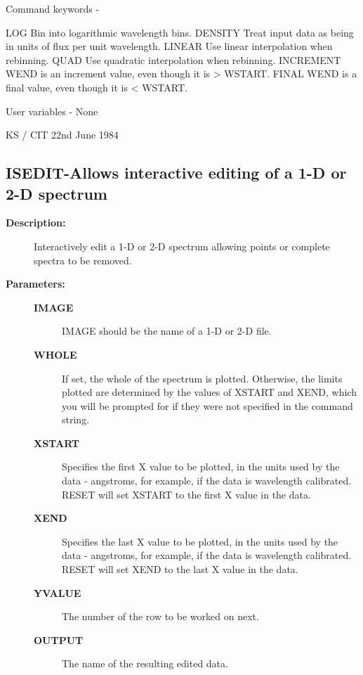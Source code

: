 \begin{description}
\begin{description}
\begin{terminalv}
 Command keywords -

 LOG        Bin into logarithmic wavelength bins.
 DENSITY    Treat input data as being in units of flux per unit
            wavelength.
 LINEAR     Use linear interpolation when rebinning.
 QUAD       Use quadratic interpolation when rebinning.
 INCREMENT  WEND is an increment value, even though it is > WSTART.
 FINAL      WEND is a final value, even though it is < WSTART.

 User variables - None

                                     KS / CIT 22nd June 1984
\end{terminalv}
\end{description}
\subsection{ISEDIT-\label{ISEDIT}Allows interactive editing of a 1-D or 2-D spectrum}
\begin{description}

\item [\textbf{Description:}]
 Interactively edit a 1-D or 2-D spectrum allowing points or
 complete spectra to be removed.

\item [\textbf{Parameters:}]
\begin{description}
\item [\textbf{IMAGE}]
 IMAGE should be the name of a 1-D or 2-D file.
\item [\textbf{WHOLE}]
 If set, the whole of the spectrum is plotted.
 Otherwise, the limits plotted are determined by the
 values of XSTART and XEND, which you will be prompted
 for if they were not specified in the command string.
\item [\textbf{XSTART}]
 Specifies the first X value to be plotted, in the units used
 by the data - angstroms, for example, if the data is wavelength
 calibrated.  RESET will set XSTART to the first X value in the data.
\item [\textbf{XEND}]
 Specifies the last X value to be plotted, in the units used by
 the data - angstroms, for example, if the data is wavelength
 calibrated.  RESET will set XEND to the last X value in the data.
\item [\textbf{YVALUE}]
 The number of the row to be worked on next.
\item [\textbf{OUTPUT}]
 The name of the resulting edited data.
\end{description}


\end{description}
\end{description}
